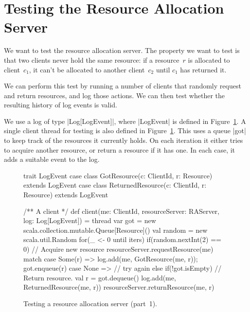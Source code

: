 \section{Testing the Resource Allocation Server}

We want to test the resource allocation server.  The property we want to
test is that two clients never hold the same resource: if a resource~$r$ is
allocated to client~$c_1$, it can't be allocated to another client~$c_2$ until
$c_1$ has returned it.

We can perform this test by running a number of clients that randomly request
and return resources, and log those actions.  We can then test whether the
resulting history of log events is valid.



We use a log of type |Log[LogEvent]|, where |LogEvent| is defined in
Figure~\ref{fig:RATest-1}.  
%
A single client thread for testing is also defined in
Figure~\ref{fig:RATest-1}.   This uses a
queue |got| to keep track of the resources it currently holds.  On each
iteration it either tries to acquire another resource, or return a resource if
it has one.  In each case, it adds a suitable event to the log.

\begin{figure}
\begin{scala}
  trait LogEvent
  case class GotResource(c: ClientId, r: Resource) extends LogEvent
  case class ReturnedResource(c: ClientId, r: Resource) extends LogEvent

  /** A client */
  def client(me: ClientId, resourceServer: RAServer, log: Log[LogEvent]) = thread{
    var got = new scala.collection.mutable.Queue[Resource]()
    val random = new scala.util.Random
    for(_ <- 0 until iters){
      if(random.nextInt(2) == 0){ // Acquire new resource
	resourceServer.requestResource(me) match{
          case Some(r) =>  log.add(me, GotResource(me, r)); got.enqueue(r)
          case None => {}  // try again
        }
      }
      else if(!got.isEmpty){     // Return resource.
	val r = got.dequeue()
        log.add(me, ReturnedResource(me, r))
	resourceServer.returnResource(me, r)
      }
    }
  }
\end{scala}
\caption{Testing a resource allocation server (part~1).}
\label{fig:RATest-1}
\end{figure}

